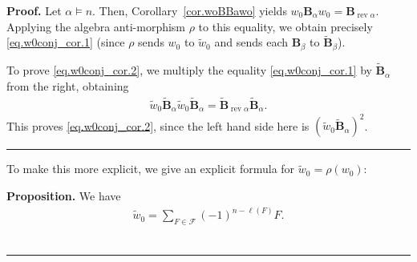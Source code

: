 \documentclass[12pt]{article}
\theoremstyle{definition}%
\newtheorem{prop}[thm]{Proposition}
\theoremstyle{definition}%
\theoremstyle{remark}%
\newcommand{\tup}[1]{\left( #1 \right)}
\newcommand{\BB}{\mathbf{B}}
\newcommand{\BBa}{\mathbf{B}_{\alpha}}
\newcommand{\BBt}{\widetilde{\mathbf{B}}}
\newcommand{\BBta}{\widetilde{\mathbf{B}}_{\alpha}}
\newcommand{\CF}{\mathcal{F}}
\newcommand{\wo}{w_0} %
\newcommand{\wotil}{\widetilde{w}_0}
\newcommand{\gaps}{\operatorname{gaps}}
\newcommand{\sub}{\operatorname{sub}}
\newcommand{\rev}{\operatorname{rev}}
\newenvironment{prop}[1][Proposition]{\noindent\textbf{#1.} }{\ \rule{0.5em}{0.5em}}
\newenvironment{proof}[1][Proof]{\noindent\textbf{#1.} }{\ \rule{0.5em}{0.5em}}
\begin{document}
\begin{proof}
Let $\alpha \models n$.
Then, Corollary~\ref{cor.woBBawo} yields $\wo \BBa \wo = \BB_{\rev \alpha}$.
Applying the algebra anti-morphism $\rho$ to this equality, we obtain precisely \eqref{eq.w0conj_cor.1}
(since $\rho$ sends $\wo$ to $\wotil$ and sends each $\BB_\beta$ to $\BBt_\beta$).

To prove \eqref{eq.w0conj_cor.2}, we multiply the equality \eqref{eq.w0conj_cor.1} by $\BBta$ from the right, obtaining
\begin{align*}
\wotil \BBta \wotil \BBta = \BBt_{\rev \alpha} \BBta.
\end{align*}
This proves \eqref{eq.w0conj_cor.2}, since the left hand side here is $\tup{\wotil \BBta}^2$.
\end{proof}

To make this more explicit, we give an explicit formula for $\wotil = \rho\tup{\wo}$:

\begin{prop}
    \label{w0face.prop}
    We have
    \begin{align}
        \wotil = \sum_{F \in \CF} \tup{ -1 }^{n-\ell\tup{ F }}F.
        \label{eq.w0face}
    \end{align}
\end{prop}
\end{document}
